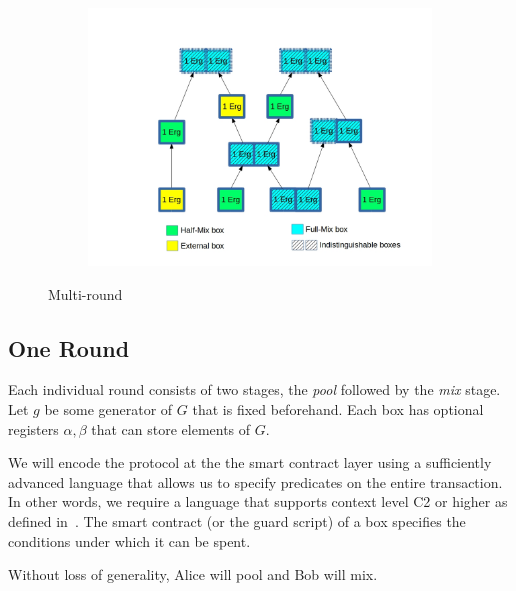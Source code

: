 \documentclass[runningheads]{llncs}
\begin{document}
\begin{figure}[h]
	\centering
	\begin{subfigure}{.7\textwidth}
		\centering
		\includegraphics[width=\linewidth]{ZeroJoin}
	\end{subfigure}
	\caption{Multi-round \algname}
\label{fig:mixname}
\end{figure}

\subsection{One \algname Round}
Each individual \algname round consists of two stages, the {\em pool} followed by the {\em mix} stage. 
Let $g$ be some generator of $G$ that is fixed beforehand. Each box has optional registers ${\alpha}, {\beta}$ that can store elements of $G$.

We will encode the protocol at the the smart contract layer using a sufficiently advanced language that allows us to specify predicates on the entire transaction. 
In other words, we require a language that supports context level C2 or higher as defined in~\cite{bypassing}. The smart contract (or the guard script) of a box specifies the conditions under which it can be spent. 

Without loss of generality, Alice will pool and Bob will mix. 
\end{document}
